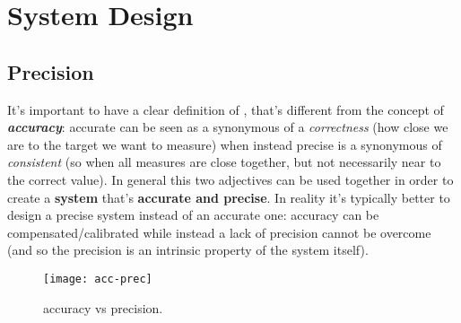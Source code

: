 \chapter{System Design}
\section{Precision}
	It's important to have a clear definition of , that's different from the concept of \textbf{\textit{accuracy}}: accurate can be seen as a synonymous of a \textit{correctness} (how close we are to the target we want to measure) when instead precise is a synonymous of \textit{consistent} (so when all measures are close together, but not necessarily near to the correct value). In general this two adjectives can be used together in order to create a \textbf{system} that's \textbf{accurate and precise}. In reality it's typically better to design a precise system instead of an accurate one: accuracy can be compensated/calibrated while instead a lack of precision cannot be overcome (and so the precision is an intrinsic property of the system itself).
	
	\begin{figure}[bht]
		\centering \texttt{[image: acc-prec]}
		\caption{accuracy vs precision.}
	\end{figure}
	
